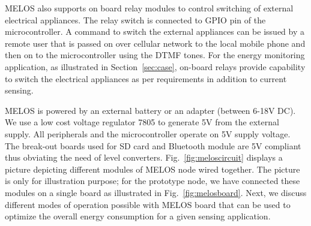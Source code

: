 \documentclass[10pt]{sigplan-proc-varsize}
\newcommand{\figref}[1]{Fig.~\ref{#1}}
\newcommand{\secref}[1]{Section~\ref{#1}}
\newcommand{\melos}{MELOS }
\begin{document}
\melos also supports on board relay modules to control switching of external electrical appliances. The relay switch is connected to GPIO pin of the microcontroller. A command to switch the external appliances can be issued by a remote user that is passed on over cellular network to the local mobile phone and then on to the microcontroller using the DTMF tones. For the energy monitoring application, as illustrated in \secref{sec:case}, on-board relays provide capability to switch the electrical appliances as per requirements in addition to current sensing.  

\melos is powered by an external battery or an adapter (between 6-18V DC). We use a low cost voltage regulator 7805 to generate 5V from the external supply. All peripherals and the microcontroller operate on 5V supply voltage. The break-out boards used for SD card and Bluetooth module are 5V compliant thus obviating the need of level converters. \figref{fig:meloscircuit} displays a picture depicting different modules of \melos node wired together. The picture is only for illustration purpose; for the prototype node, we have connected these modules on a single board as illustrated in \figref{fig:melosboard}. Next,  we discuss different modes of operation possible with \melos board that can be used to optimize the overall energy consumption for a given sensing application.





%
\end{document}
